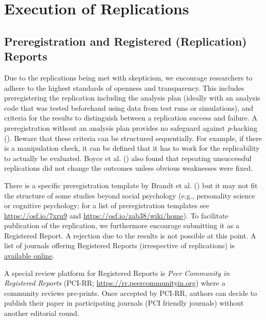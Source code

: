 \documentclass[
  letterpaper,
  DIV=11,
  openany,
  fontsize=12pt,
  parskip=half,
  headings=big,
  numbers=noenddot,
  titlepage=false]{scrreprt}
\begin{document}
\chapter{Execution of Replications}\label{execution-of-replications}

\section{Preregistration and Registered (Replication)
Reports}\label{preregistration-and-registered-replication-reports}

Due to the replications being met with skepticism, we encourage
researchers to adhere to the highest standards of openness and
transparency. This includes preregistering the replication including the
analysis plan (ideally with an analysis code that was tested beforehand
using data from test runs or simulations), and criteria for the results
to distinguish between a replication success and failure. A
preregistration without an analysis plan provides no safeguard against
\emph{p}-hacking (). Beware that these criteria can be structured sequentially. For
example, if there is a manipulation check, it can be defined that it has
to work for the replicability to actually be evaluated. Boyce et al.
() also found that repeating
unsuccessful replications did not change the outcomes unless obvious
weaknesses were fixed.

There is a specific preregistration template by Brandt et al.
() but it may not fit the structure
of some studies beyond social psychology (e.g., personality science or
cognitive psychology; for a list of preregistration templates see
\url{https://osf.io/7xrn9} and \url{https://osf.io/zab38/wiki/home}). To
facilitate publication of the replication, we furthermore encourage
submitting it as a Registered Report. A rejection due to the results is
not possible at this point. A list of journals offering Registered
Reports (irrespective of replications) is
\href{https://docs.google.com/spreadsheets/d/1D4_k-8C_UENTRtbPzXfhjEyu3BfLxdOsn9j-otrO870/edit\#gid=0}{available
online}.

A special review platform for Registered Reports is \emph{Peer Community
in Registered Reports} (PCI-RR; \url{https://rr.peercommunityin.org})
where a community reviews pre-prints. Once accepted by PCI-RR, authors
can decide to publish their paper in participating journals (PCI
friendly journals) without another editorial round.
\end{document}
